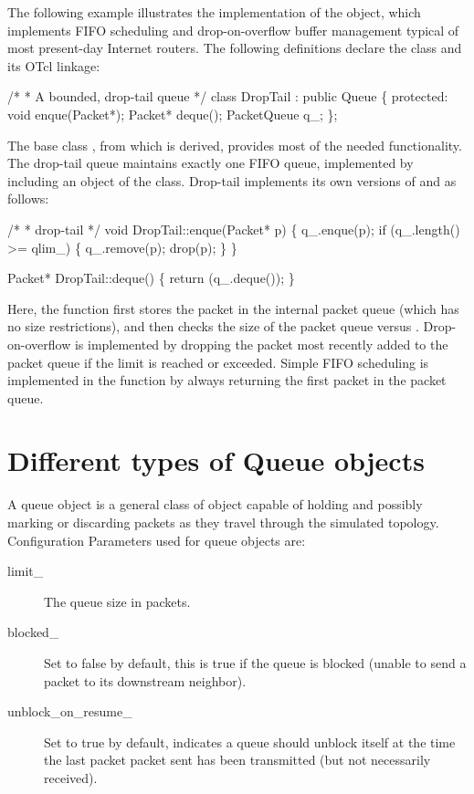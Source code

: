 The following example illustrates the implementation of the
 object,
which implements FIFO scheduling and
drop-on-overflow buffer management typical of most present-day
Internet routers.
The following definitions declare the class and its OTcl linkage:
\begin{program}
        /*
         * {\cf A bounded, drop-tail queue}
         */
        class DropTail : public Queue \{
         protected:
                void enque(Packet*);
                Packet* deque();
                PacketQueue q_;
        \};
\end{program}
The base class ,
from which  is derived, provides most
of the needed functionality.
The drop-tail queue maintains exactly one FIFO queue, implemented
by including an object of the  class.
Drop-tail implements its own versions of  and 
as follows:
\begin{program}
        /*
         * {\cf drop-tail}
         */
        void DropTail::enque(Packet* p)
        \{
                q_.enque(p);
                if (q_.length() >= qlim_) \{
                        q_.remove(p);
                        drop(p);
                \}
        \}

        Packet* DropTail::deque()
        \{
                return (q_.deque());
        \}
\end{program}
Here, the  function first stores the packet in the
internal packet queue (which has no size restrictions), and then
checks the size of the packet queue versus .
Drop-on-overflow is implemented by dropping the packet most recently
added to the packet queue if the limit is reached or exceeded.
Simple FIFO scheduling is implemented in the  function
by always returning the first packet in the packet queue.


\section{Different types of Queue objects}
\label{sec:queueobjects}
A queue object is a general class of object capable of holding and
possibly marking or discarding packets as they travel through the
simulated topology. Configuration Parameters used for queue objects are:
\begin{description}
\item[limit\_] The queue size in packets. 

\item[blocked\_] Set to false by default, this is true if the queue is
blocked (unable to send a packet to its downstream neighbor). 

\item[unblock\_on\_resume\_] Set to true by default, indicates a queue
should unblock itself at the time the last packet packet sent has been
transmitted (but not necessarily received). 
\end{description}

